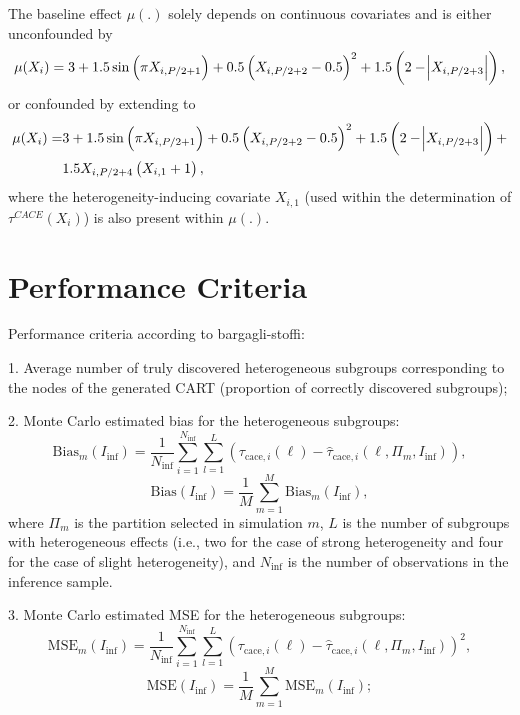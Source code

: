 The baseline effect $\mu(.)$ solely depends on continuous covariates and is either unconfounded by 
\begin{align*}
    \mu(X_i) = 3 + 1.5 \sin{\left(\pi X_{i, P/2 + 1}\right)} + 0.5\left(X_{i, P/2+2} - 0.5\right)^2 + 
    1.5\left(2-\abs{X_{i, P/2+3}}\right),
\end{align*}
or confounded by extending to
\begin{align*}
    \mu(X_i) = &3 + 1.5 \sin{\left(\pi X_{i, P/2 + 1}\right)} + 0.5\left(X_{i, P/2+2} - 0.5\right)^2 + 
    1.5\left(2-\abs{X_{i, P/2+3}}\right) + \\
    &1.5X_{i, P/2 + 4}\left(X_{i, 1} + 1\right),
\end{align*}
where the heterogeneity-inducing covariate $X_{i, 1}$ (used within the determination of $\tau^{CACE}(X_i)$) is also present within $\mu(.)$.


\section{Performance Criteria}

Performance criteria according to bargagli-stoffi: 

1. Average number of truly discovered heterogeneous subgroups corresponding to the nodes of the generated CART (proportion of correctly discovered subgroups);

2. Monte Carlo estimated bias for the heterogeneous subgroups:
\begin{equation}
\text{Bias}_m(I_\text{inf}) = \frac{1}{N_\text{inf}} \sum_{i=1}^{N_\text{inf}} \sum_{l=1}^{L} \left( \tau_{\text{cace},i}(\ell) - \hat{\tau}_{\text{cace},i}(\ell, \Pi_m, I_\text{inf}) \right),
\end{equation}
\begin{equation}
\text{Bias}(I_\text{inf}) = \frac{1}{M} \sum_{m=1}^{M} \text{Bias}_m(I_\text{inf}),
\end{equation}
where $\Pi_m$ is the partition selected in simulation $m$, $L$ is the number of subgroups with heterogeneous effects (i.e., two for the case of strong heterogeneity and four for the case of slight heterogeneity), and $N_\text{inf}$ is the number of observations in the inference sample.

3. Monte Carlo estimated MSE for the heterogeneous subgroups:
\begin{equation}
\text{MSE}_m(I_\text{inf}) = \frac{1}{N_\text{inf}} \sum_{i=1}^{N_\text{inf}} \sum_{l=1}^{L} \left( \tau_{\text{cace},i}(\ell) - \hat{\tau}_{\text{cace},i}(\ell, \Pi_m, I_\text{inf}) \right)^2,
\end{equation}
\begin{equation}
\text{MSE}(I_\text{inf}) = \frac{1}{M} \sum_{m=1}^{M} \text{MSE}_m(I_\text{inf});
\end{equation}

